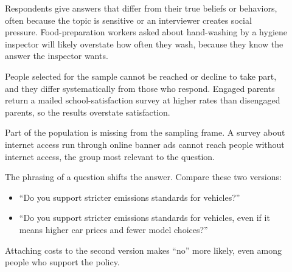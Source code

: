 \begin{description}
    \item[] Respondents give answers that differ from their true beliefs or behaviors, 
    often because the topic is sensitive or an interviewer creates social pressure. Food-preparation workers asked about hand-washing 
    by a hygiene inspector will likely overstate how often they wash, because they know the answer the inspector wants.

    \item[] People selected for the sample cannot be reached or decline to take part, 
    and they differ systematically from those who respond. Engaged parents return a mailed school-satisfaction survey at higher rates 
    than disengaged parents, so the results overstate satisfaction.

    \item[] Part of the population is missing from the sampling frame. 
    A survey about internet access run through online banner ads cannot reach people without internet access, the group most relevant to the question.

    \item[] The phrasing of a question shifts the answer. Compare these two versions:
    \begin{itemize}
        \item ``Do you support stricter emissions standards for vehicles?''
        \item ``Do you support stricter emissions standards for vehicles, even if it means higher car prices and fewer model choices?''
    \end{itemize}
    Attaching costs to the second version makes ``no'' more likely, even among people who support the policy.
\end{description}


